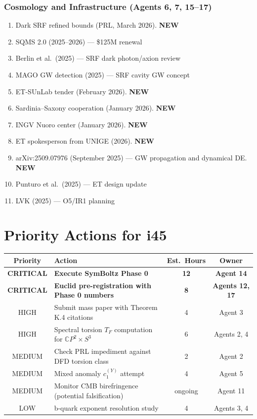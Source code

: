 \documentclass[11pt,a4paper]{article}
\newcommand{\NEW}{\textcolor{dfdblue}{\textbf{NEW}}}
\newcommand{\CP}{\mathbb{C}P}
\begin{document}
\section{Cosmology and Infrastructure (Agents 6, 7, 15--17)}

\begin{enumerate}
\item Dark SRF refined bounds (PRL, March 2026). \NEW
\item SQMS 2.0 (2025--2026) --- \$125M renewal
\item Berlin et al.\ (2025) --- SRF dark photon/axion review
\item MAGO GW detection (2025) --- SRF cavity GW concept
\item ET-SUnLab tender (February 2026). \NEW
\item Sardinia--Saxony cooperation (January 2026). \NEW
\item INGV Nuoro center (January 2026). \NEW
\item ET spokesperson from UNIGE (2026). \NEW
\item arXiv:2509.07976 (September 2025) --- GW propagation and dynamical DE. \NEW
\item Punturo et al.\ (2025) --- ET design update
\item LVK (2025) --- O5/IR1 planning
\end{enumerate}


\part{Priority Actions for i45}

\begin{center}
\begin{tabular}{clcc}
\toprule
\textbf{Priority} & \textbf{Action} & \textbf{Est.\ Hours} & \textbf{Owner} \\
\midrule
\textbf{CRITICAL} & \textbf{Execute SymBoltz Phase 0} & \textbf{12} & \textbf{Agent 14} \\
\textbf{CRITICAL} & \textbf{Euclid pre-registration with Phase 0 numbers} & \textbf{8} & \textbf{Agents 12, 17} \\
HIGH & Submit mass paper with Theorem K.4 citations & 4 & Agent 3 \\
HIGH & Spectral torsion $T_F$ computation for $\CP^2 \times S^3$ & 6 & Agents 2, 4 \\
MEDIUM & Check PRL impediment against DFD torsion class & 2 & Agent 2 \\
MEDIUM & Mixed anomaly $c_1^{(Y)}$ attempt & 4 & Agent 5 \\
MEDIUM & Monitor CMB birefringence (potential falsification) & ongoing & Agent 11 \\
LOW & b-quark exponent resolution study & 4 & Agents 3, 4 \\
\bottomrule
\end{tabular}
\end{center}
\end{document}
